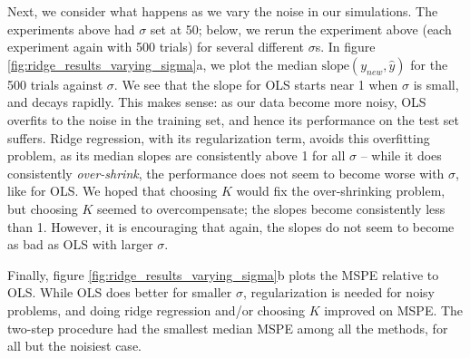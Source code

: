 \documentclass[main]{subfiles}
\begin{document}
\par
Next, we consider what happens as we vary the noise in our simulations. The experiments above had $\sigma$ set at 50; below,
we rerun the experiment above (each experiment again with 500 trials) for several different $\sigma$s.
In figure \ref{fig:ridge_results_varying_sigma}a, we plot the median $\text{slope}(y_{new}, \hat y)$ for the 500 trials against $\sigma$.
We see that the slope for OLS starts near 1 when $\sigma$ is small, and decays rapidly. This makes sense: as our data
become more noisy, OLS overfits to the noise in the training set, and hence its performance on the test set suffers.
Ridge regression, with its regularization term, avoids this overfitting problem, as its median slopes are consistently above 1 for
all $\sigma$ -- while it does consistently {\itshape over-shrink}, the performance does not seem to become worse
with $\sigma$, like for OLS. We hoped that choosing $K$ would fix the over-shrinking problem, but choosing
$K$ seemed to overcompensate; the slopes become consistently less than 1. However, it is encouraging that again, the slopes
do not seem to become as bad as OLS with larger $\sigma$.

Finally, figure \ref{fig:ridge_results_varying_sigma}b plots the MSPE relative to OLS.
While OLS does better for smaller $\sigma$, regularization is needed for noisy problems, and doing ridge regression and/or
choosing $K$ improved on MSPE. The two-step procedure had the smallest median MSPE among all the methods,
for all but the noisiest case.
\end{document}
